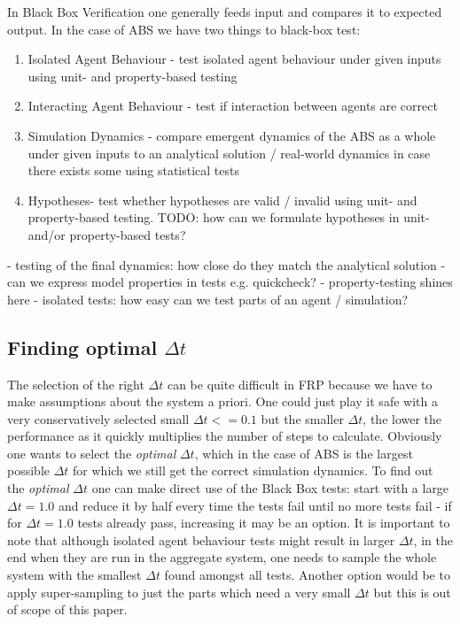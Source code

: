 In Black Box Verification one generally feeds input and compares it to expected output. In the case of ABS we have two things to black-box test:
\begin{enumerate}
	\item Isolated Agent Behaviour - test isolated agent behaviour under given inputs using unit- and property-based testing
	\item Interacting Agent Behaviour - test if interaction between agents are correct 
	\item Simulation Dynamics - compare emergent dynamics of the ABS as a whole under given inputs to an analytical solution / real-world dynamics in case there exists some using statistical tests
	\item Hypotheses- test whether hypotheses are valid / invalid using unit- and property-based testing. TODO: how can we formulate hypotheses in unit- and/or property-based tests?
\end{enumerate}

- testing of the final dynamics: how close do they match the analytical solution
- can we express model properties in tests e.g. quickcheck?
- property-testing shines here
- isolated tests: how easy can we test parts of an agent / simulation?

\subsection{Finding optimal $\Delta t$}
The selection of the right $\Delta t$ can be quite difficult in FRP because we have to make assumptions about the system a priori. One could just play it safe with a very conservatively selected small $\Delta t <= 0.1$ but the smaller $\Delta t$, the lower the performance as it quickly multiplies the number of steps to calculate. Obviously one wants to select the \textit{optimal} $\Delta t$, which in the case of ABS is the largest possible $\Delta t$ for which we still get the correct simulation dynamics.
To find out the \textit{optimal} $\Delta t$ one can make direct use of the Black Box tests: start with a large $\Delta t = 1.0$ and reduce it by half every time the tests fail until no more tests fail - if for $\Delta t = 1.0$ tests already pass, increasing it may be an option. It is important to note that although isolated agent behaviour tests might result in larger $\Delta t$, in the end when they are run in the aggregate system, one needs to sample the whole system with the smallest $\Delta t$ found amongst all tests. Another option would be to apply super-sampling to just the parts which need a very small $\Delta t$ but this is out of scope of this paper.

